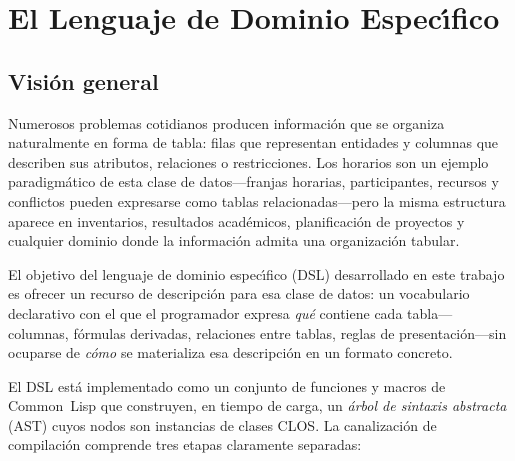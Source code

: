 \chapter{El Lenguaje de Dominio Espec\'{\i}fico}
\label{cap:dsl}

\section{Visi\'on general}
\label{sec:vision-general}

Numerosos problemas cotidianos producen informaci\'on que se organiza
naturalmente en forma de tabla: filas que representan entidades y columnas
que describen sus atributos, relaciones o restricciones.  Los horarios son
un ejemplo paradigm\'atico de esta clase de datos---franjas horarias,
participantes, recursos y conflictos pueden expresarse como tablas
relacionadas---pero la misma estructura aparece en inventarios, resultados
acad\'emicos, planificaci\'on de proyectos y cualquier dominio donde la
informaci\'on admita una organizaci\'on tabular.

El objetivo del lenguaje de dominio espec\'{\i}fico (DSL) desarrollado en
este trabajo es ofrecer un recurso de descripci\'on para esa clase de datos:
un vocabulario declarativo con el que el programador expresa \emph{qu\'e}
contiene cada tabla---columnas, f\'ormulas derivadas, relaciones entre
tablas, reglas de presentaci\'on---sin ocuparse de \emph{c\'omo} se
materializa esa descripci\'on en un formato concreto.

El DSL est\'a implementado como un conjunto de funciones y macros de
Common~Lisp que construyen, en tiempo de carga, un \emph{\'arbol de sintaxis
abstracta} (AST) cuyos nodos son instancias de clases CLOS.  La
canalizaci\'on de compilaci\'on comprende tres etapas claramente separadas:

